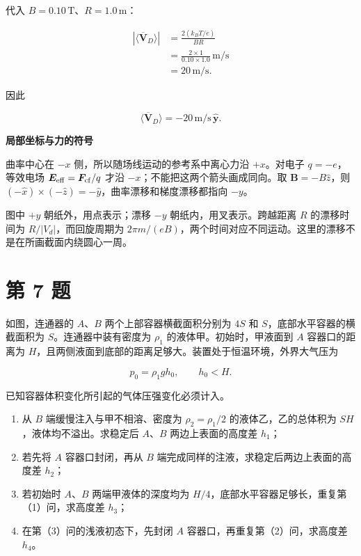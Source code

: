 \documentclass[12pt,a4paper,UTF8]{ctexart}
\newcommand{\tightlist}{\setlength{\itemsep}{0pt}\setlength{\parskip}{0pt}}
\begin{document}
代入 \(B=0.10\,\mathrm T\)、\(R=1.0\,\mathrm m\)：

\[
\begin{aligned}
\left|\langle\overline{\boldsymbol V}_D\rangle\right|
&=\frac{2(k_BT/e)}{BR}\\
&=\frac{2\times1}{0.10\times1.0}\,\mathrm{m/s}\\
&=20\,\mathrm{m/s}.
\end{aligned}
\]

因此

\[
\boxed{
\langle\overline{\boldsymbol V}_D\rangle
=-20\,\mathrm{m/s}\,\hat{\boldsymbol y}
}.
\tag{29}
\]

\textbf{局部坐标与力的符号}

曲率中心在 \(-x\) 侧，所以随场线运动的参考系中离心力沿 \(+x\)。对电子
\(q=-e\)，等效电场 \(\bm E_{\rm eff}=\bm F_{\rm cf}/q\) 才沿
\(-x\)；不能把这两个箭头画成同向。取 \(\bm B=-B\hat z\)，则
\((-\hat x)\times(-\hat z)=-\hat y\)，曲率漂移和梯度漂移都指向 \(-y\)。

图中 \(+y\) 朝纸外，用点表示；漂移 \(-y\) 朝纸内，用叉表示。跨越距离
\(R\) 的漂移时间为 \(R/|V_d|\)，而回旋周期为
\(2\pi m/(eB)\)，两个时间对应不同运动。这里的漂移不是在所画截面内绕圆心一周。

\newpage

\section{第 7 题}\label{ux7b2c-7-ux9898}

如图，连通器的 \(A\)、\(B\) 两个上部容器横截面积分别为 \(4S\) 和
\(S\)，底部水平容器的横截面积为 \(S\)。连通器中装有密度为 \(\rho_1\)
的液体甲。初始时，甲液面到 \(A\) 容器口的距离为
\(H\)，且两侧液面到底部的距离足够大。装置处于恒温环境，外界大气压为

\[
p_0=\rho_1gh_0,
\qquad h_0<H.
\]

已知容器体积变化所引起的气体压强变化必须计入。

\begin{enumerate}
\def\labelenumi{\arabic{enumi}.}
\tightlist
\item
  从 \(B\) 端缓慢注入与甲不相溶、密度为 \(\rho_2=\rho_1/2\)
  的液体乙，乙的总体积为 \(SH\)，液体均不溢出。求稳定后 \(A\)、\(B\)
  两边上表面的高度差 \(h_1\)；
\item
  若先将 \(A\) 容器口封闭，再从 \(B\)
  端完成同样的注液，求稳定后两边上表面的高度差 \(h_2\)；
\item
  若初始时 \(A\)、\(B\) 两端甲液体的深度均为
  \(H/4\)，底部水平容器足够长，重复第（1）问，求高度差 \(h_3\)；
\item
  在第（3）问的浅液初态下，先封闭 \(A\)
  容器口，再重复第（2）问，求高度差 \(h_4\)。
\end{enumerate}
\end{document}
